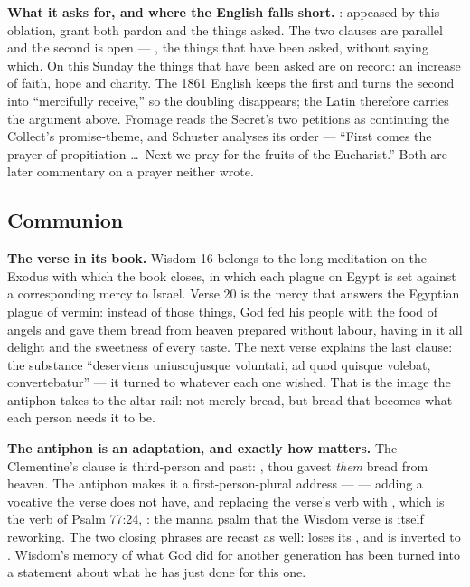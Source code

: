 \textbf{What it asks for, and where the English falls short.} :
appeased by this oblation, grant both pardon and the things asked. The two
 clauses are parallel and the second is open --- ,
the things that have been asked, without saying which. On this Sunday the
things that have been asked are on record: an increase of faith, hope and
charity. The 1861 English keeps the first  and turns the
second into ``mercifully receive,'' so the doubling disappears; the Latin
therefore carries the argument above. Fromage reads the Secret's two
petitions as continuing the Collect's promise-theme, and Schuster analyses its
order --- ``First comes the prayer of propitiation \dots\ Next we pray for the
fruits of the Eucharist.'' Both are later commentary on a prayer neither
wrote.

\elementguard
\subsection*{Communion }


\textbf{The verse in its book.} Wisdom 16 belongs to the long meditation on the
Exodus with which the book closes, in which each plague on Egypt is set against
a corresponding mercy to Israel. Verse 20 is the mercy that answers the
Egyptian plague of vermin: instead of those things, God fed his people with the
food of angels and gave them bread from heaven prepared without labour, having
in it all delight and the sweetness of every taste. The next verse explains the
last clause: the substance ``deserviens uniuscujusque voluntati, ad quod quisque
volebat, convertebatur'' --- it turned to whatever each one wished. That is the
image the antiphon takes to the altar rail: not merely bread, but bread that
becomes what each person needs it to be.

\textbf{The antiphon is an adaptation, and exactly how matters.}
The Clementine's clause is third-person and past: , thou gavest \textit{them} bread from heaven.
The antiphon makes it a first-person-plural address ---  --- adding a vocative the verse does not have, and replacing the verse's
verb  with , which is the verb of Psalm 77:24,
: the manna psalm that the Wisdom verse is itself
reworking. The two closing phrases are recast as well:  loses its , and  is inverted to . Wisdom's memory
of what God did for another generation has been turned into a statement about
what he has just done for this one.

